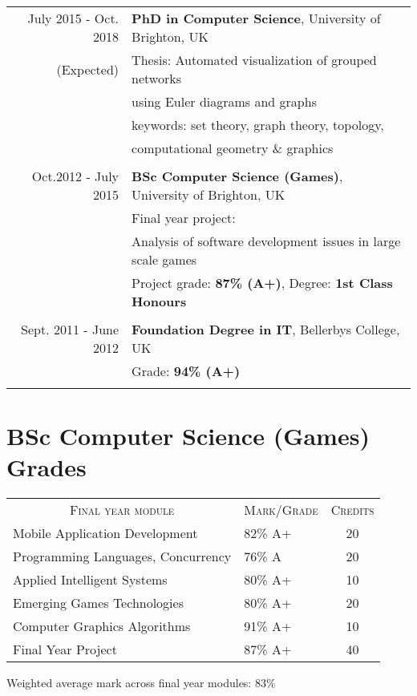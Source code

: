 \documentclass[a4paper,11pt]{article} %
\begin{document}
\begin{tabular}{r|p{11cm}}
July 2015 - Oct. 2018 & \textbf{PhD in Computer Science}, University of Brighton, UK\\
(Expected)& Thesis: Automated visualization of grouped networks\\
& using Euler diagrams and graphs\\
& keywords: set theory, graph theory, topology,\\
& computational geometry \& graphics \\
\multicolumn{2}{c}{} \\

	
Oct.2012 - July 2015 & \textbf{BSc Computer Science (Games)}, University of Brighton, UK\\
& Final year project: \\
& Analysis of software development issues in large scale games\\
&\normalsize Project grade: \textbf{87\% (A+)}, Degree: \textbf{1st Class Honours} \\
\multicolumn{2}{c}{} \\


Sept. 2011 - June 2012 & \textbf{Foundation Degree in IT}, Bellerbys College, UK\\
&\normalsize Grade: \textbf{94\% (A+)} \\
\multicolumn{2}{c}{} \\

\end{tabular}



\section{BSc Computer Science (Games) Grades}

\begin{center}
\begin{tabular}{llc}
\multicolumn{1}{c}{\textsc{Final year module}} & \textsc{Mark/Grade}&\textsc{Credits}\\
Mobile Application Development                                  & 82\% A+ & 20\\
Programming Languages, Concurrency                              & 76\% A & 20\\
Applied Intelligent Systems                                     & 80\% A+ & 10\\
Emerging Games Technologies                                     & 80\% A+ & 20\\
Computer Graphics Algorithms                                    & 91\% A+ & 10\\
Final Year Project                                              & 87\% A+ & 40\\
\end{tabular}
\end{center}
\bigskip
Weighted average mark across final year modules: 83\%
\end{document}
